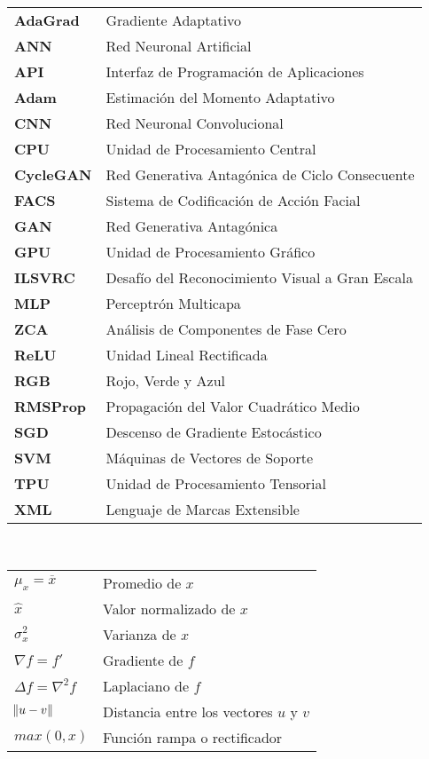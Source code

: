 \thispagestyle{plain}

\begin{abbreviations}
\begin{tabular}{l l}
    \\
    \textbf{AdaGrad} & Gradiente Adaptativo \\
    \textbf{ANN} & Red Neuronal Artificial \\
    \textbf{API} & Interfaz de Programación de Aplicaciones \\
    \textbf{Adam} & Estimación del Momento Adaptativo \\
    \textbf{CNN} & Red Neuronal Convolucional \\
    \textbf{CPU} & Unidad de Procesamiento Central \\
    \textbf{CycleGAN} & Red Generativa Antagónica de Ciclo Consecuente \\
    \textbf{FACS} & Sistema de Codificación de Acción Facial \\
    \textbf{GAN} & Red Generativa Antagónica \\
    \textbf{GPU} & Unidad de Procesamiento Gráfico \\
    \textbf{ILSVRC} & Desafío del Reconocimiento Visual a Gran Escala \\
    \textbf{MLP} & Perceptrón Multicapa \\
    \textbf{ZCA} & Análisis de Componentes de Fase Cero \\
    \textbf{ReLU} & Unidad Lineal Rectificada \\
    \textbf{RGB} & Rojo, Verde y Azul \\
    \textbf{RMSProp} & Propagación del Valor Cuadrático Medio \\
    \textbf{SGD} & Descenso de Gradiente Estocástico \\
    \textbf{SVM} & Máquinas de Vectores de Soporte \\
    \textbf{TPU} & Unidad de Procesamiento Tensorial \\
    \textbf{XML} & Lenguaje de Marcas Extensible \\

\end{tabular}
\end{abbreviations}
\\
\begin{mathexprs}
\begin{tabular}{l l}
    \textbf{$\mu_x = \overline{x}$} & Promedio de $x$ \\
    \textbf{$\hat{x}$} & Valor normalizado de $x$ \\
    \textbf{$\sigma_{x}^{2}$} & Varianza de $x$ \\
    \textbf{$\nabla f = f'$} & Gradiente de $f$ \\
    \textbf{$\Delta f = \nabla^2 f$} & Laplaciano de $f$ \\
    \textbf{$\norm{u - v}$} & Distancia entre los vectores $u$ y $v$ \\
    \textbf{$max(0, x)$} & Función rampa o rectificador \\
    
  
\end{tabular}
\end{mathexprs}

